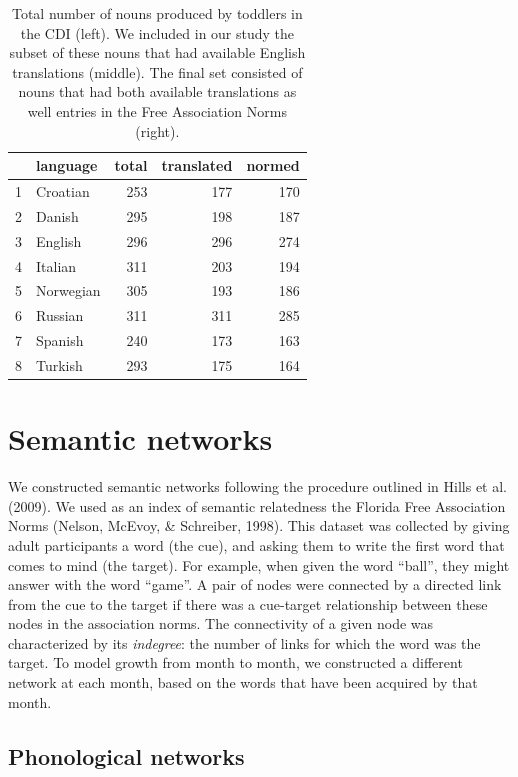 \documentclass[english,floatsintext,man]{apa6}
\theoremstyle{definition}
\theoremstyle{definition}
\theoremstyle{definition}
\theoremstyle{remark}
\begin{document}
\begin{table}[H]
\centering
\begin{tabular}{rlrrr}
  \hline
 & language & total & translated & normed \\ 
  \hline
1 & Croatian & 253 & 177 & 170 \\ 
  2 & Danish & 295 & 198 & 187 \\ 
  3 & English & 296 & 296 & 274 \\ 
  4 & Italian & 311 & 203 & 194 \\ 
  5 & Norwegian & 305 & 193 & 186 \\ 
  6 & Russian & 311 & 311 & 285 \\ 
  7 & Spanish & 240 & 173 & 163 \\ 
  8 & Turkish & 293 & 175 & 164 \\ 
   \hline
\end{tabular}
\caption{\label{tab:stats}Total number of nouns produced by toddlers in the CDI (left). We included in our study the subset of these nouns that had available English translations (middle). The final set consisted of nouns that had both available translations as well entries in the Free Association Norms (right).} 
\end{table}

\section{Semantic networks}\label{semantic-networks}

We constructed semantic networks following the procedure outlined in
Hills et al. (2009). We used as an index of semantic relatedness the
Florida Free Association Norms (Nelson, McEvoy, \& Schreiber, 1998).
This dataset was collected by giving adult participants a word (the
cue), and asking them to write the first word that comes to mind (the
target). For example, when given the word \enquote{ball}, they might
answer with the word \enquote{game}. A pair of nodes were connected by a
directed link from the cue to the target if there was a cue-target
relationship between these nodes in the association norms. The
connectivity of a given node was characterized by its \emph{indegree}:
the number of links for which the word was the target. To model growth
from month to month, we constructed a different network at each month,
based on the words that have been acquired by that month.

\subsection{Phonological networks}\label{phonological-networks}
\end{document}
